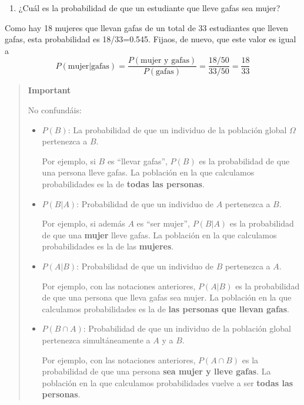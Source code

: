 \documentclass[
  spanish,
  letterpaper,
  DIV=11,
  numbers=noendperiod]{scrreprt}
\providecommand{\tightlist}{%
  \setlength{\itemsep}{0pt}\setlength{\parskip}{0pt}}
\begin{document}
\begin{tcolorbox}
\begin{enumerate}
\def\labelenumi{\arabic{enumi}.}
\setcounter{enumi}{5}
\tightlist
\item
  ¿Cuál es la probabilidad de que un estudiante que lleve gafas sea
  mujer?
\end{enumerate}

Como hay 18 mujeres que llevan gafas de un total de 33 estudiantes que
lleven gafas, esta probabilidad es 18/33=0.545. Fijaos, de nuevo, que
este valor es igual a \[
P(\text{mujer}|\text{gafas})=\frac{P(\text{mujer y gafas})}{P(\text{gafas})}=\frac{18/50}{33/50}=\frac{18}{33}
\]

\begin{quote}
\textbf{Important}

No confundáis:

\begin{itemize}
\item
  \(P(B)\): La probabilidad de que un individuo de la población global
  \(\Omega\) pertenezca a \(B\).

  Por ejemplo, si \(B\) es ``llevar gafas'', \(P(B)\) es la probabilidad
  de que una persona lleve gafas. La población en la que calculamos
  probabilidades es la de \textbf{todas las personas}.
\item
  \(P(B|A)\): Probabilidad de que un individuo de \(A\) pertenezca a
  \(B\).

  Por ejemplo, si además \(A\) es ``ser mujer'', \(P(B|A)\) es la
  probabilidad de que una \textbf{mujer} lleve gafas. La población en la
  que calculamos probabilidades es la de las \textbf{mujeres}.
\item
  \(P(A|B)\): Probabilidad de que un individuo de \(B\) pertenezca a
  \(A\).

  Por ejemplo, con las notaciones anteriores, \(P(A|B)\) es la
  probabilidad de que una persona que lleva gafas sea mujer. La
  población en la que calculamos probabilidades es la de \textbf{las
  personas que llevan gafas}.
\item
  \(P(B\cap A)\): Probabilidad de que un individuo de la población
  global pertenezca simultáneamente a \(A\) y a \(B\).

  Por ejemplo, con las notaciones anteriores, \(P(A\cap B)\) es la
  probabilidad de que una persona \textbf{sea mujer y lleve gafas}. La
  población en la que calculamos probabilidades vuelve a ser
  \textbf{todas las personas}.
\end{itemize}
\end{quote}


\end{tcolorbox}
\end{document}
